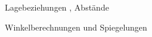 

\newcommand{\vektor}[1]{\ensuremath\begin{pmatrix} #1 \end{pmatrix}}


\begin{inhalt}
	\item Lagebeziehungen , Abstände 
	\item Winkelberechnungen und Spiegelungen 
\end{inhalt}





